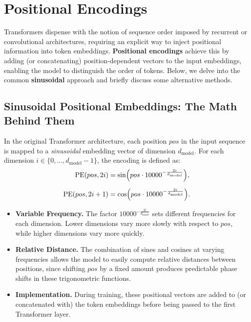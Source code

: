 \section{Positional Encodings}
\label{sec:positional_encodings}

\noindent
Transformers dispense with the notion of sequence order imposed by recurrent or convolutional architectures, requiring an explicit way to inject positional information into token embeddings. \textbf{Positional encodings} achieve this by adding (or concatenating) position-dependent vectors to the input embeddings, enabling the model to distinguish the order of tokens. Below, we delve into the common \textbf{sinusoidal} approach and briefly discuss some alternative methods.

\subsection{Sinusoidal Positional Embeddings: The Math Behind Them}
\noindent
In the original Transformer architecture, each position $pos$ in the input sequence is mapped to a \emph{sinusoidal} embedding vector of dimension $d_\text{model}$. For each dimension $i \in \{0, \ldots, d_\text{model}-1\}$, the encoding is defined as:
\[
\begin{aligned}
\text{PE}(pos, 2i) &= \sin\Bigl(pos \cdot 10000^{-\frac{2i}{d_\text{model}}}\Bigr), \\[6pt]
\text{PE}(pos, 2i+1) &= \cos\Bigl(pos \cdot 10000^{-\frac{2i}{d_\text{model}}}\Bigr).
\end{aligned}
\]
\begin{itemize}
    \item \textbf{Variable Frequency.} The factor $10000^{-\frac{2i}{d_\text{model}}}$ sets different frequencies for each dimension. Lower dimensions vary more slowly with respect to $pos$, while higher dimensions vary more quickly.
    \item \textbf{Relative Distance.} The combination of sines and cosines at varying frequencies allows the model to easily compute relative distances between positions, since shifting $pos$ by a fixed amount produces predictable phase shifts in these trigonometric functions.
    \item \textbf{Implementation.} During training, these positional vectors are added to (or concatenated with) the token embeddings before being passed to the first Transformer layer.
\end{itemize}


